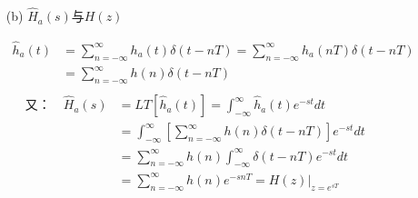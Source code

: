 \documentclass[notheorems,compress,mathserif,table]{beamer}
\begin{document}
%
%
\begin{frame}[shrink]\frametitle{}%
\begin{enumerate}
    \item[(b)] $\hat{H}_a(s)$与$H(z)$
\end{enumerate}
            \begin{equation*}
              \begin{split}
                \hat{h}_a(t) &=\sum_{n=-\infty}^{\infty}h_a(t)\delta(t-nT)
                             =\sum_{n=-\infty}^{\infty}h_a(nT)\delta(t-nT)\\
                             &=\sum_{n=-\infty}^{\infty}h(n)\delta(t-nT)\\
              \end{split}
            \end{equation*}
            \begin{equation*}
              \begin{split}
            \mbox{又：}\quad     \hat{H}_a(s)
                     &= LT[\hat{h}_a(t)]
                      =\int_{-\infty}^{\infty}\hat{h}_a(t)e^{-st}dt\quad\quad\quad\quad\quad\quad\\
                     &=\int_{-\infty}^{\infty}\left[
                            \sum_{n=-\infty}^{\infty}h(n)\delta(t-nT)\right]e^{-st}dt\\
                     &=\sum_{n=-\infty}^{\infty}h(n)\int_{-\infty}^{\infty}
                             \delta(t-nT)e^{-st}dt\\
                     &= \sum_{n=-\infty}^{\infty}h(n)e^{-snT} =H(z)|_{z=e^{sT}}
              \end{split}
            \end{equation*}
\end{frame}
%
%
\end{document}
